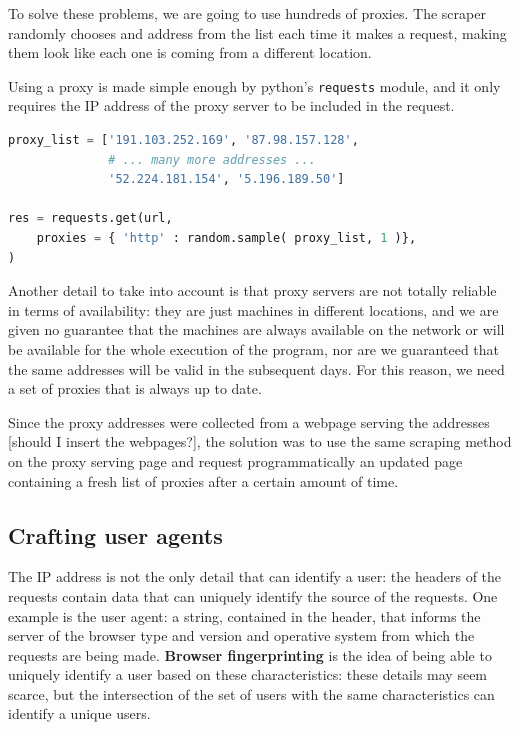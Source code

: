 \documentclass[LaM,oneside,binding=0.6cm]{sapthesis}
\begin{document}
To solve these problems, we are going to use hundreds of proxies. The scraper randomly chooses and address from the list each time it makes a request, making them look like each one is coming from a different location.

Using a proxy is made simple enough by python's \texttt{requests} module, and it only requires the IP address of the proxy server to be included in the request.  
\\
\begin{lstlisting}[language=python,firstnumber=1]
proxy_list = ['191.103.252.169', '87.98.157.128', 
              # ... many more addresses ...
              '52.224.181.154', '5.196.189.50']

res = requests.get(url,
    proxies = { 'http' : random.sample( proxy_list, 1 )},
)
\end{lstlisting}

Another detail to take into account is that proxy servers are not totally reliable in terms of availability: they are just machines in different locations, and we are given no guarantee that the machines are always available on the network or will be available for the whole execution of the program, nor are we guaranteed that the same addresses will be valid in the subsequent days. For this reason, we need a set of proxies that is always up to date. 

Since the proxy addresses were collected from a webpage serving the addresses [should I insert the webpages?], the solution was to use the same scraping method on the proxy serving page and request programmatically an updated page containing a fresh list of proxies after a certain amount of time.  


\subsection{Crafting user agents}

The IP address is not the only detail that can identify a user: the headers of the requests contain data that can uniquely identify the source of the requests. One example is the user agent: a string, contained in the header, that informs the server of the browser type and version and operative system from which the requests are being made. \textbf{Browser fingerprinting} is the idea of being able to uniquely identify a user based on these characteristics: these details may seem scarce, but the intersection of the set of users with the same characteristics can identify a unique users.
\end{document}
